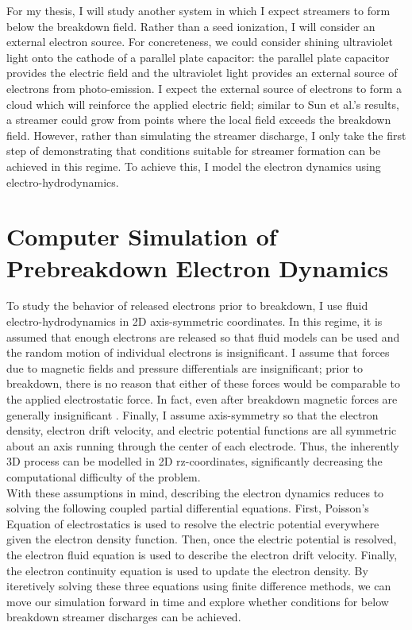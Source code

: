 \documentclass[11pt]{article}
\begin{document}
For my thesis, I will study another system in which I expect streamers to form below the breakdown field. Rather than a seed ionization, I will consider an external electron source. For concreteness, we could consider shining ultraviolet light onto the cathode of a parallel plate capacitor: the parallel plate capacitor provides the electric field and the ultraviolet light provides an external source of electrons from photo-emission. I expect the external source of electrons to form a cloud which will reinforce the applied electric field; similar to Sun et al.'s results, a streamer could grow from points where the local field exceeds the breakdown field. However, rather than simulating the streamer discharge, I only take the first step of demonstrating that conditions suitable for streamer formation can be achieved in this regime. To achieve this, I model the electron dynamics using electro-hydrodynamics. 


\section{Computer Simulation of Prebreakdown Electron Dynamics}
To study the behavior of released electrons prior to breakdown, I use fluid electro-hydrodynamics in 2D axis-symmetric coordinates. In this regime, it is assumed that enough electrons are released so that fluid models can be used and the random motion of individual electrons is insignificant. I assume that forces due to magnetic fields and pressure differentials are insignificant; prior to breakdown, there is no reason that either of these forces would be comparable to the applied electrostatic force. In fact, even after breakdown magnetic forces are generally insignificant \cite{Nijdam}. Finally, I assume axis-symmetry so that the electron density, electron drift velocity, and electric potential functions are all symmetric about an axis running through the center of each electrode. Thus, the inherently 3D process can be modelled in 2D rz-coordinates, significantly decreasing the computational difficulty of the problem. \\

With these assumptions in mind, describing the electron dynamics reduces to solving the following coupled partial differential equations. First, Poisson's Equation of electrostatics is used to resolve the electric potential everywhere given the electron density function. Then, once the electric potential is resolved, the electron fluid equation is used to describe the electron drift velocity. Finally, the electron continuity equation is used to update the electron density. By iteretively solving these three equations using finite difference methods, we can move our simulation forward in time and explore whether conditions for below breakdown streamer discharges can be achieved. 
\end{document}
